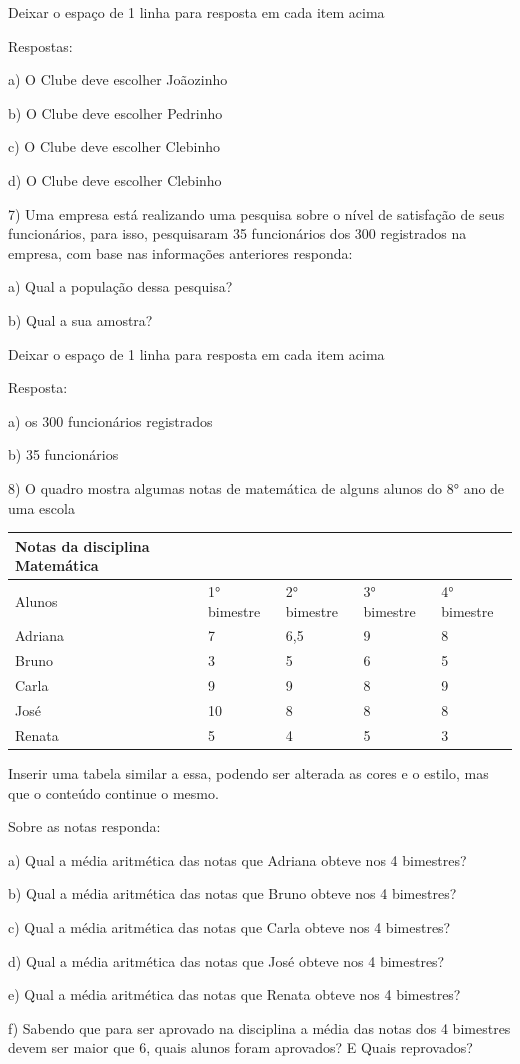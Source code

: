 {Deixar o espaço de 1 linha para resposta em cada item acima

Respostas:

a) O Clube deve escolher Joãozinho

b) O Clube deve escolher Pedrinho

c) O Clube deve escolher Clebinho

d) O Clube deve escolher Clebinho

7) Uma empresa está realizando uma pesquisa sobre o nível de satisfação
de seus funcionários, para isso, pesquisaram 35 funcionários dos 300
registrados na empresa, com base nas informações anteriores responda:

a) Qual a população dessa pesquisa?

b) Qual a sua amostra?

Deixar o espaço de 1 linha para resposta em cada item acima

Resposta:

a) os 300 funcionários registrados

b) 35 funcionários

8) O quadro mostra algumas notas de matemática de alguns alunos do 8°
ano de uma escola

\begin{longtable}[]{@{}lllll@{}}
\toprule
Notas da disciplina Matemática & & & &\tabularnewline
\midrule
\endhead
Alunos & 1° bimestre & 2° bimestre & 3° bimestre & 4°
bimestre\tabularnewline
Adriana & 7 & 6,5 & 9 & 8\tabularnewline
Bruno & 3 & 5 & 6 & 5\tabularnewline
Carla & 9 & 9 & 8 & 9\tabularnewline
José & 10 & 8 & 8 & 8\tabularnewline
Renata & 5 & 4 & 5 & 3\tabularnewline
\bottomrule
\end{longtable}

Inserir uma tabela similar a essa, podendo ser alterada as cores e o
estilo, mas que o conteúdo continue o mesmo.

Sobre as notas responda:

a) Qual a média aritmética das notas que Adriana obteve nos 4 bimestres?

b) Qual a média aritmética das notas que Bruno obteve nos 4 bimestres?

c) Qual a média aritmética das notas que Carla obteve nos 4 bimestres?

d) Qual a média aritmética das notas que José obteve nos 4 bimestres?

e) Qual a média aritmética das notas que Renata obteve nos 4 bimestres?

f) Sabendo que para ser aprovado na disciplina a média das notas dos 4
bimestres devem ser maior que 6, quais alunos foram aprovados? E Quais
reprovados?

}
